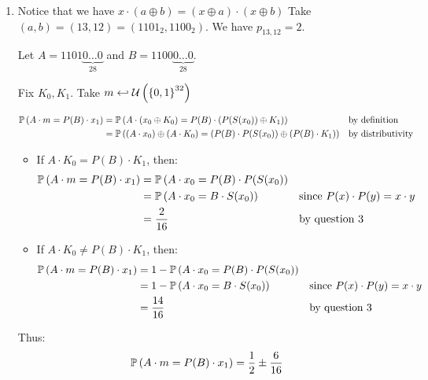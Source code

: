 \begin{enumerate}[label=\textbf{\arabic*})]
    \item
    Notice that we have $x \cdot (a \oplus b) = (x \oplus a)\cdot(x \oplus b)$
    Take $(a, b) = (13, 12) = (1101_2, 1100_2)$. We have $p_{13, 12} = 2$.

    Let $A = 1101\underbrace{0\dots0}_{28}$ and $B = 1100\underbrace{0\dots0}_{28}$.

    Fix $K_0, K_1$. Take $m \hookleftarrow \mathcal{U}\left(\left\{ 0,1 \right\}^{32}\right)$

    \begin{align*}
        \mathbb{P}\left( A\cdot m = P(B)\cdot x_1 \right) &= \mathbb{P}\left( A\cdot (x_0 \oplus K_0) = P(B) \cdot (P(S(x_0))\oplus K_1) \right) && \text{by definition}\\
            &= \mathbb{P}\left( (A\cdot x_0) \oplus (A \cdot K_0) = (P(B) \cdot P(S(x_0)) \oplus (P(B) \cdot K_1) \right) && \text{by distributivity}\\
    \end{align*}

    \begin{itemize}
        \item If $A \cdot K_0 = P(B) \cdot K_1$, then:
        \begin{align*}
            \mathbb{P}\left( A\cdot m = P(B)\cdot x_1 \right) &= \mathbb{P}\left( A\cdot x_0 = P(B) \cdot P(S(x_0) \right)\\
                &= \mathbb{P}\left( A\cdot x_0 = B \cdot S(x_0) \right) && \text{since } P(x) \cdot P(y) = x \cdot y\\
                &= \frac{2}{16} && \text{by question 3}
        \end{align*}
        \item If $A \cdot K_0 \neq P(B) \cdot K_1$, then:
        \begin{align*}
            \mathbb{P}\left( A\cdot m = P(B)\cdot x_1 \right) &= 1-\mathbb{P}\left( A\cdot x_0 = P(B) \cdot P(S(x_0) \right)\\
                &= 1-\mathbb{P}\left( A\cdot x_0 = B \cdot S(x_0) \right) && \text{since } P(x) \cdot P(y) = x \cdot y\\
                &= \frac{14}{16} && \text{by question 3}
        \end{align*}
    \end{itemize}
    Thus:
    \[\mathbb{P}\left( A\cdot m = P(B)\cdot x_1 \right) = \frac{1}{2} \pm \frac{6}{16}\]
\end{enumerate}


